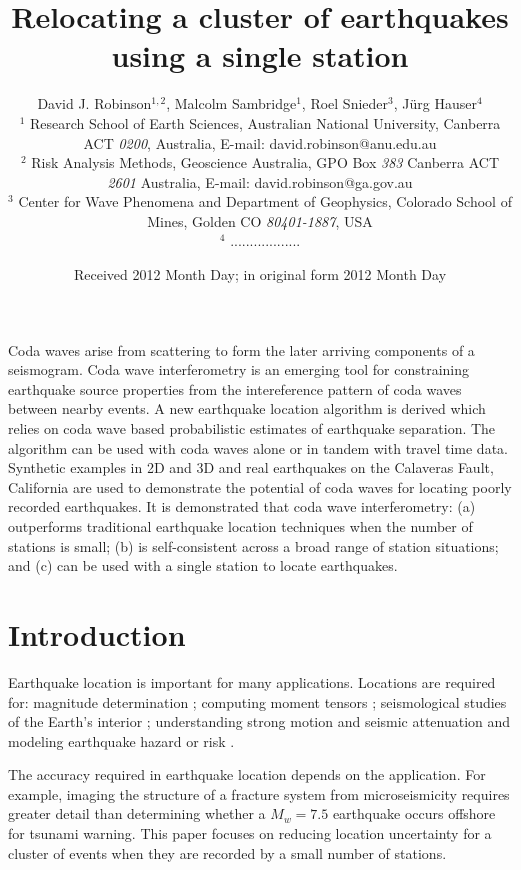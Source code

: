 \documentclass[extra, onecolumn, doublespacing]{gji}
\title{Relocating a cluster of earthquakes using a single station}
\author[D.J. Robinson, M. Sambridge, R. Snieder and J Hauser]
  {David J. Robinson$^{1,2}$, Malcolm Sambridge$^{1}$, Roel Snieder$^{3}$, J\"urg Hauser$^{4}$ \\
  $^1$ Research School of Earth Sciences, Australian National
    University, Canberra ACT \emph{0200}, Australia, E-mail: david.robinson@anu.edu.au \\
$^2$  Risk Analysis Methods, Geoscience Australia, GPO Box \emph{383} Canberra ACT \emph{2601} Australia, E-mail: david.robinson@ga.gov.au\\
$^3$ Center for Wave Phenomena and Department of Geophysics, Colorado School of Mines, Golden CO \emph{80401-1887}, USA \\
$^4$ ..................}
\date{Received 2012 Month Day; in original form 2012 Month Day}
\begin{document}
\label{firstpage}

\maketitle


\begin{summary}
Coda waves arise from scattering to form the later arriving
components of a seismogram. Coda wave interferometry is an emerging
tool for constraining earthquake source properties from the
intereference pattern of coda waves between nearby events. A new
earthquake location algorithm is derived which relies on coda wave
based probabilistic estimates of earthquake separation. The
algorithm can be used with coda waves alone or in tandem with travel
time data. Synthetic examples in 2D and 3D and real earthquakes on
the Calaveras Fault, California are used to demonstrate the
potential of coda waves for locating poorly recorded earthquakes. It
is demonstrated that coda wave interferometry: (a) outperforms
traditional earthquake location techniques when the number of
stations is small; (b) is self-consistent across a broad range of
station situations; and (c) can be used with a single station to
locate earthquakes.

\end{summary}


\section{Introduction}

Earthquake location is important for many applications. Locations
are required for:  magnitude
determination \citep{dr_Richter35a, dr_Gutenberg45a};
computing moment tensors \citep{dr_Sipkin02a};
seismological studies of the Earth's interior
\citep{dr_Spencer80a, dr_Kennett95a, dr_Curtis02a, dr_Kennett04a};
understanding strong motion and seismic attenuation
\citep{dr_Toro97a, dr_Campbell03a}
 and modeling earthquake hazard or risk
\citep{dr_Frankel00a, dr_Stirling02a, dr_Robinson06b}.

The accuracy required in earthquake location depends on the
application. For example, imaging the structure of a fracture system
from microseismicity requires greater detail than determining
whether a $M_w=7.5$ earthquake occurs offshore for tsunami warning.
 This paper focuses on reducing location uncertainty for
a cluster of events when they are recorded by a small
number of stations.
\end{document}
